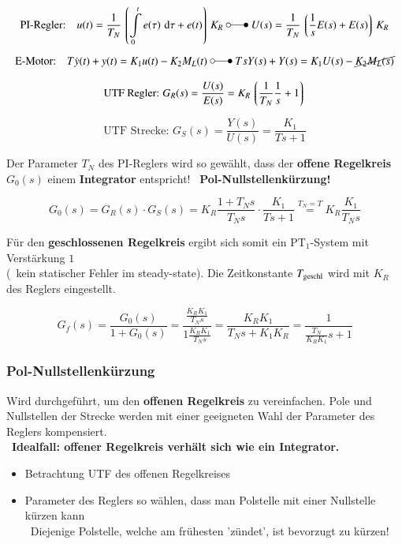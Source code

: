 \vspace{-0.4cm}
$$ \text{PI-Regler:} \quad u(t) = \frac{1}{T_N} \left\lgroup \int\limits_0^t e(\tau) \, \diff \tau + e(t) \right\rgroup K_R
    \; \laplace \; U(s) = \frac{1}{T_N} \left\lgroup \frac{1}{s} E(s) + E(s) \right\rgroup K_R $$
$$ \text{E-Motor:} \quad T \dot{y}(t) + y(t) = K_1 u(t) - K_2 M_L(t) 
    \; \laplace \; T s Y(s) + Y(s) = K_1 U(s) - \cancel{ K_2 M_L(s)} $$

\vspace{-0.3cm}
\begin{minipage}[t]{0.53\columnwidth}
    $$ \text{UTF Regler: } G_R(s) = \frac{U(s)}{E(s)} = K_R \left\lgroup \frac{1}{T_N} \frac{1}{s} + 1 \right\rgroup $$
\end{minipage}
\hfill
\begin{minipage}[t]{0.46\columnwidth}
    $$ \text{UTF Strecke: } G_S(s) = \frac{Y(s)}{U(s)} = \frac{K_1}{T s + 1} $$
\end{minipage}

Der  Parameter $T_N$ des PI-Reglers wird so gewählt, dass der \textbf{offene Regelkreis} $G_0(s)$ einem \textbf{Integrator} entspricht!
\textrightarrow\ \textbf{Pol-Nullstellenkürzung!}

$$ G_0(s) = G_R(s) \cdot G_S(s) = K_R \frac{1 + T_N s}{T_N s} \cdot \frac{K_1}{T s + 1} \overset{T_N = T}{=} K_R \frac{K_1}{T_N s} $$

Für den \textbf{geschlossenen Regelkreis} ergibt sich somit ein $\text{PT}_1$-System mit Verstärkung $1$\\
(\textrightarrow\ kein statischer Fehler im steady-state). Die Zeitkonstante $T_{\rm geschl}$ wird mit $K_R$ des Reglers eingestellt.

$$ G_f(s) = \frac{G_0(s)}{1 + G_0(s)} =  \frac{\frac{K_R  K_1}{T_N s} }{1 \frac{K_R  K_1}{T_N s}} = \frac{K_R K_1}{T_N s + K_1 K_R} = \frac{1}{\frac{T_N}{K_R  K_1}s + 1} $$


\subsubsection{Pol-Nullstellenkürzung}

Wird durchgeführt, um den \textbf{offenen Regelkreis} zu vereinfachen. Pole und Nullstellen der Strecke werden mit einer geeigneten
Wahl der Parameter des Reglers kompensiert. \\
\textrightarrow\ \textbf{Idealfall: offener Regelkreis verhält sich wie ein Integrator.}

\begin{itemize}
    \item Betrachtung UTF des offenen Regelkreises
    \item Parameter des Reglers so wählen, dass man Polstelle mit einer Nullstelle kürzen kann \\
        \textrightarrow\ Diejenige Polstelle, welche am frühesten 'zündet', ist bevorzugt zu kürzen!
\end{itemize}


